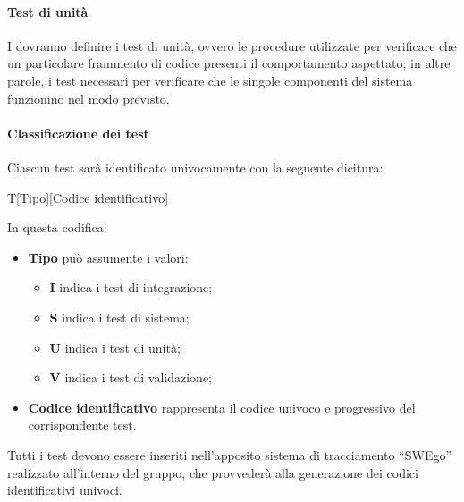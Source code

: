 \documentclass[../NormeDiProgetto.tex]{subfiles}
\begin{document}
			\paragraph{Test di unità\\}     
				I \progettisti dovranno definire i test di unità, ovvero le procedure utilizzate per verificare che un particolare frammento di codice presenti il comportamento aspettato; in altre parole, i test necessari per verificare che le singole
				componenti del sistema funzionino nel modo previsto.
				
			\paragraph{Classificazione dei test\\}
				Ciascun test sarà identificato univocamente con la seguente dicitura:
				\begin{center}
					T[Tipo][Codice identificativo]
				\end{center}
				In questa codifica:
				\begin{itemize}
					\item \textbf{Tipo} può assumente i valori:
					\begin{itemize}
						\item \textbf{I} indica i test di integrazione;
						\item \textbf{S} indica i test di sistema;
						\item \textbf{U} indica i test di unità;
						\item \textbf{V} indica i test di validazione;
					\end{itemize}
					\item \textbf{Codice identificativo} rappresenta il codice univoco e progressivo del
					corrispondente test.
				\end{itemize}
				Tutti i test devono essere inseriti nell'apposito sistema di tracciamento ``SWEgo''
				realizzato all'interno del gruppo, che provvederà alla generazione
				dei codici identificativi univoci.
				
\end{document}
